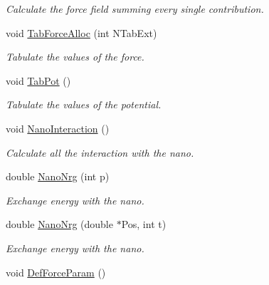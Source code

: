 \begin{DoxyCompactItemize}
\begin{DoxyCompactList}\small\item\em Calculate the force field summing every single contribution. \end{DoxyCompactList}\item 
void \hyperlink{classForces_ab7b56f14cb877cece5075bc6a160aab3}{Tab\+Force\+Alloc} (int N\+Tab\+Ext)\hypertarget{classForces_ab7b56f14cb877cece5075bc6a160aab3}{}\label{classForces_ab7b56f14cb877cece5075bc6a160aab3}

\begin{DoxyCompactList}\small\item\em Tabulate the values of the force. \end{DoxyCompactList}\item 
void \hyperlink{classForces_a1c00d241ca805ba05becca0e9aafe45f}{Tab\+Pot} ()\hypertarget{classForces_a1c00d241ca805ba05becca0e9aafe45f}{}\label{classForces_a1c00d241ca805ba05becca0e9aafe45f}

\begin{DoxyCompactList}\small\item\em Tabulate the values of the potential. \end{DoxyCompactList}\item 
void \hyperlink{classForces_ac56bd243d0c3cac921959104fac03d2c}{Nano\+Interaction} ()\hypertarget{classForces_ac56bd243d0c3cac921959104fac03d2c}{}\label{classForces_ac56bd243d0c3cac921959104fac03d2c}

\begin{DoxyCompactList}\small\item\em Calculate all the interaction with the nano. \end{DoxyCompactList}\item 
double \hyperlink{classForces_a7ab5c0bcf11c3f33530a25984720b424}{Nano\+Nrg} (int p)\hypertarget{classForces_a7ab5c0bcf11c3f33530a25984720b424}{}\label{classForces_a7ab5c0bcf11c3f33530a25984720b424}

\begin{DoxyCompactList}\small\item\em Exchange energy with the nano. \end{DoxyCompactList}\item 
double \hyperlink{classForces_af2058d93db6e3ef4894d33f6790a6749}{Nano\+Nrg} (double $\ast$Pos, int t)\hypertarget{classForces_af2058d93db6e3ef4894d33f6790a6749}{}\label{classForces_af2058d93db6e3ef4894d33f6790a6749}

\begin{DoxyCompactList}\small\item\em Exchange energy with the nano. \end{DoxyCompactList}\item 
void \hyperlink{classForces_ad7e01b1bd04ce252d991ae872eaa5270}{Def\+Force\+Param} ()\hypertarget{classForces_ad7e01b1bd04ce252d991ae872eaa5270}{}\label{classForces_ad7e01b1bd04ce252d991ae872eaa5270}


\end{DoxyCompactItemize}
